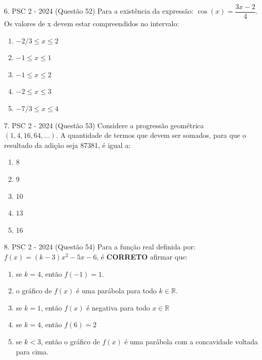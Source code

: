 \documentclass[aspectratio=169]{beamer}
\newif\ifusarcorvermelha
\newcommand{\vermelho}[1]{%
    \ifusarcorvermelha
        {\color{red}#1}%
    \else
        #1%
    \fi
}
\begin{document}
    \begin{frame}{6. PSC 2 - 2024 (Questão 52)}
       Para a existência da expressão: $\cos(x) = \dfrac{3x-2}{4}$. Os valores de x  devem estar compreendidos no intervalo:


         \begin{enumerate}[a]
                    \item \vermelho{$-{2}/{3} \leq x \leq 2$} %
                    \item $-1 \leq x \leq 1$
                    \item $-1 \leq x \leq 2$
                    \item $-2 \leq x \leq 3$
                    \item $-{7}/{3} \leq x \leq 4$
                \end{enumerate}        
    \end{frame}

    \begin{frame}{7. PSC 2 - 2024 (Questão 53)}
      Considere a progressão geométrica $(1, 4, 16, 64, … )$. A quantidade de termos que devem ser somados, para que o resultado da adição seja 87381, é igual a:


         \begin{enumerate}[a]
                    \item 8
                    \item \vermelho{9} %
                    \item 10
                    \item 13
                    \item 16
                \end{enumerate}        
    \end{frame}

    \begin{frame}{8. PSC 2 - 2024 (Questão 54)}
      Para a função real definida por: $f(x)=(k-3)x^{2}-5x-6$, é \textbf{CORRETO} afirmar que:

         \begin{enumerate}[a]
                    \item se $k=4$, então $f(-1)=1.$
                    \item o gráfico de $f(x)$ é uma parábola para todo $k \in \mathbb{R}$.
                    \item \vermelho{se $k=1$, então $f(x)$ é negativa para todo $x \in \mathbb{R}$} %
                    \item se $k = 4$, então $f(6)=2$
                    \item se $k <3$, então o gráfico de $f(x)$ é uma parábola com a concavidade voltada para cima.
                \end{enumerate}        
    \end{frame}
\end{document}
